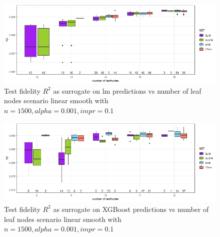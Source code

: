 \begin{figure}[!htb]
     \centering
    \includegraphics[width=14cm]{Figures/simulations/batchtools/basic_scenarios/linear_smooth/ls_1000_lm_r2_test.png}
    \caption{Test fidelity $R^2$ as surrogate on lm predictions vs number of leaf nodes scenario linear smooth with $n=1500, alpha = 0.001, impr = 0.1$}
\label{fig:app_ls_1000_lm_r2_test}
\end{figure} 

\begin{figure}[!htb]
     \centering     
    \includegraphics[width=14cm]{Figures/simulations/batchtools/basic_scenarios/linear_smooth/ls_1000_xgboost_r2_test.png}
    \caption{Test fidelity $R^2$ as surrogate on XGBoost predictions vs number of leaf nodes scenario linear smooth with $n=1500, alpha = 0.001, impr = 0.1$}
    \label{fig:app_ls_1000_xgboost_r2_test}
\end{figure} 



